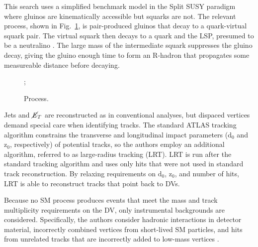 \documentclass[12pt]{article}
\begin{document}
        This search uses a simplified benchmark model in the Split SUSY paradigm where gluinos are kinematically accessible but squarks are not. The relevant process, shown in Fig.~\ref{displaced_process}, is pair-produced gluinos that decay to a quark-virtual squark pair. The virtual squark then decays to a quark and the LSP, presumed to be a neutralino . The large mass of the intermediate squark suppresses the gluino decay, giving the gluino enough time to form an R-hadron that propagates some measureable distance before decaying. 

        \noindent \begin{figure}[htbp] \begin{center}
        ;
        \caption{Process.}
        \label{displaced_process}
        \end{center} \end{figure}

        Jets and $\cancel{\it{E}}_{T}$ are reconstructed as in conventional analyses, but dispaced vertices demand special care when identifying tracks. The standard ATLAS tracking algorithm constrains the transverse and longitudinal impact parameters ($\mathrm{d}_0$ and $\mathrm{z}_0$, respectively) of potential tracks, so the authors employ an additional algorithm, referred to as large-radius tracking (LRT). LRT is run after the standard tracking algorithm and uses only hits that were not used in standard track reconstruction. By relaxing requirements on $\mathrm{d}_0$, $\mathrm{z}_0$, and number of hits, LRT is able to reconstruct tracks that point back to DVs.
        
        Because no SM process produces events that meet the mass and track multiplicity requirements on the DV, only instrumental backgrounds are considered. Specifically, the authors consider hadronic interactions in detector material, incorrectly combined vertices from short-lived SM particles, and hits from unrelated tracks that are incorrectly added to low-mass vertices .
\end{document}
